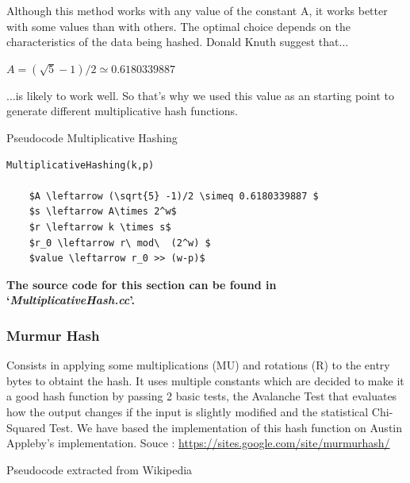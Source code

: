 \documentclass[12pt]{article}
\begin{document}
\bigskip

Although this method works with any value of the constant A, it works better with some values than with others. The optimal choice depends on the characteristics of the data being hashed. Donald Knuth suggest that...

$ A = (\sqrt{5} -1)/2 \simeq 0.6180339887  $

...is likely to work well. So that's why we used this value as an starting point to generate different multiplicative hash functions.
\bigskip

\begin{center}
\begin{large}
Pseudocode Multiplicative Hashing
\end{large}
\end{center}

\begin{lstlisting}[mathescape=true]
MultiplicativeHashing(k,p)

	$A \leftarrow (\sqrt{5} -1)/2 \simeq 0.6180339887 $
	$s \leftarrow A\times 2^w$
	$r \leftarrow k \times s$ 
	$r_0 \leftarrow r\ mod\  (2^w) $ 
	$value \leftarrow r_0 >> (w-p)$

\end{lstlisting}

\textbf{The source code for this section can be found in `\textit{MultiplicativeHash.cc}'.}
\bigskip



\subsubsection{Murmur Hash}

Consists in applying some multiplications (MU) and rotations (R) to the entry bytes to obtaint the hash. It uses multiple constants which are decided to make it a good hash function by passing 2 basic tests, the Avalanche Test that evaluates how the output changes if the input is slightly modified and the statistical Chi-Squared Test. We have based the implementation of this hash function on Austin Appleby's implementation. Souce : \url{https://sites.google.com/site/murmurhash/}\\
\medskip
\begin{center}
\begin{large}
Pseudocode extracted from Wikipedia
\end{large}
\end{center}
\end{document}
